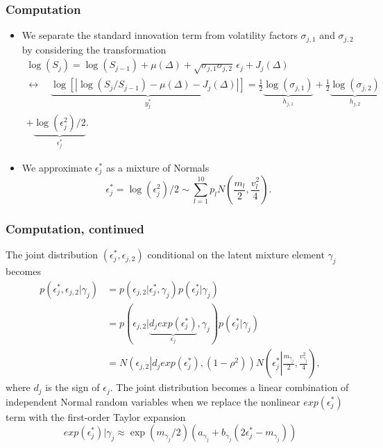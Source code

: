 \documentclass{beamer}
\begin{document}
\begin{frame}
  \frametitle{Computation}
  \begin{itemize}
  \item We separate the standard innovation term from volatility
    factors $\sigma_{j,1}$ and $\sigma_{j,2}$ by considering the
    transformation
  \begin{multline*}
    \log(S_{j}) = \log(S_{j-1}) + \mu(\Delta) + \sqrt{\sigma_{j,1}\sigma_{j,2}} \, \epsilon_{j} + J_j(\Delta) \\
  \leftrightarrow \quad \underbrace{ \log\left[ \left| \log(S_{j}/S_{j-1}) - \mu(\Delta) - J_j(\Delta) \right| \right] }_{y_j^*} = \frac{1}{2}\underbrace{  \log(\sigma_{j,1}) }_{h_{j,1}} + \frac{1}{2}\underbrace{  \log(\sigma_{j,2}) }_{h_{j,2}} \\
   + \underbrace{ \log(  \epsilon_{j}^2  )/2 }_{\epsilon_{j}^{*}}.
 \end{multline*}
 \pause
\item We approximate $\epsilon^*_{j}$ as a mixture of Normals
 \[
   \epsilon^*_{j} = \log( \epsilon_{j}^2 )/2 \sim \sum_{l=1}^{10} p_l N \left( \frac{m_l}{2}, \frac{v_l^2}{4} \right).
 \]
\end{itemize}
\end{frame}
\begin{frame}
  \frametitle{Computation, continued}
  The joint distribution $(\epsilon^*_j, \epsilon_{j,2})$ conditional on the latent mixture element $\gamma_j$ becomes
  \begin{align*}
    p(\epsilon^*_j, \epsilon_{j,2} | \gamma_j) &= p(\epsilon_{j,2}|\epsilon^*_{j}, \gamma_j)p(\epsilon^*_{j}| \gamma_j) \\
                                               &= p(\epsilon_{j,2}|\underbrace{d_j exp(\epsilon^*_{j})}_{\epsilon_j}, \gamma_j)p(\epsilon^*_{j}| \gamma_j) \\
    &= N\left( \epsilon_{j,2} \left| d_j exp(\epsilon^*_{j}), (1-\rho^2) \right.\right) N\left( \epsilon_j^* \left| \frac{m_{\gamma_j}}{2}, \frac{v^2_{\gamma_j}}{4} \right. \right),
  \end{align*}
  where $d_j$ is the sign of $\epsilon_j$. \pause The joint
  distribution becomes a linear combination of independent Normal
  random variables when we replace the nonlinear $exp(\epsilon^*_{j})$
  term with the first-order Taylor expansion
  \[
    exp(\epsilon^*_{j}) | \gamma_j \approx \exp(m_{\gamma_j}/2)(a_{\gamma_j} + b_{\gamma_j}(2\epsilon_j^* - m_{\gamma_j}))
  \]
 
\end{frame}
\end{document}
